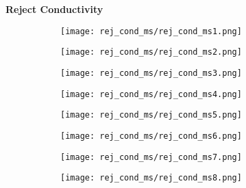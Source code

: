 \documentclass{article}
\begin{document}
    \textbf{Reject Conductivity}
    \begin{figure}[H]
        \centering
        \begin{subfigure}{0.48\linewidth}
		    \texttt{[image: rej\_cond\_ms/rej\_cond\_ms1.png]}
	    \end{subfigure}
	    \begin{subfigure}{0.48\linewidth}
		    \texttt{[image: rej\_cond\_ms/rej\_cond\_ms2.png]}
	    \end{subfigure}
	    \begin{subfigure}{0.48\linewidth}
		    \texttt{[image: rej\_cond\_ms/rej\_cond\_ms3.png]}
	    \end{subfigure}
	    \begin{subfigure}{0.48\linewidth}
		    \texttt{[image: rej\_cond\_ms/rej\_cond\_ms4.png]}
	    \end{subfigure}
	    \begin{subfigure}{0.48\linewidth}
		    \texttt{[image: rej\_cond\_ms/rej\_cond\_ms5.png]}
	    \end{subfigure}
	    \begin{subfigure}{0.48\linewidth}
		    \texttt{[image: rej\_cond\_ms/rej\_cond\_ms6.png]}
	    \end{subfigure}
	    \begin{subfigure}{0.48\linewidth}
		    \texttt{[image: rej\_cond\_ms/rej\_cond\_ms7.png]}
	    \end{subfigure}
	    \begin{subfigure}{0.48\linewidth}
		    \texttt{[image: rej\_cond\_ms/rej\_cond\_ms8.png]}
	    \end{subfigure}
    \end{figure}
    
    \pagebreak
    
\end{document}
